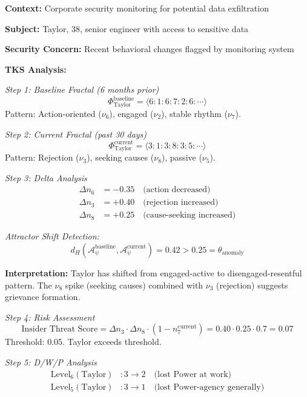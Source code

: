 \documentclass[11pt,twoside]{book}
\theoremstyle{definition}
\theoremstyle{plain}
\theoremstyle{remark}
\newcommand{\noe}[1]{\nu_{#1}}
\newcommand{\Frac}{\Phi}
\newcommand{\PsychAttractor}{\mathcal{A}_\psi}
\begin{document}
\begin{tcolorbox}[colback=yellow!5!white,colframe=yellow!65!black,title=\textbf{Scenario: Insider Threat Detection via Fractal Anomaly},breakable]

\textbf{Context:} Corporate security monitoring for potential data exfiltration

\textbf{Subject:} Taylor, 38, senior engineer with access to sensitive data

\textbf{Security Concern:} Recent behavioral changes flagged by monitoring system

\textbf{TKS Analysis:}

\textit{Step 1: Baseline Fractal (6 months prior)}
\[
    \Frac_{\mathrm{Taylor}}^{\mathrm{baseline}} = \langle 6:1:6:7:2:6:\cdots \rangle
\]
Pattern: Action-oriented ($\noe{6}$), engaged ($\noe{2}$), stable rhythm ($\noe{7}$).

\textit{Step 2: Current Fractal (past 30 days)}
\[
    \Frac_{\mathrm{Taylor}}^{\mathrm{current}} = \langle 3:1:3:8:3:5:\cdots \rangle
\]
Pattern: Rejection ($\noe{3}$), seeking causes ($\noe{8}$), passive ($\noe{5}$).

\textit{Step 3: Delta Analysis}
\begin{align*}
    \Delta n_6 &= -0.35 \quad \text{(action decreased)} \\
    \Delta n_3 &= +0.40 \quad \text{(rejection increased)} \\
    \Delta n_8 &= +0.25 \quad \text{(cause-seeking increased)}
\end{align*}

\textit{Attractor Shift Detection:}
\[
    d_H(\PsychAttractor^{\mathrm{baseline}}, \PsychAttractor^{\mathrm{current}}) = 0.42 > 0.25 = \theta_{\mathrm{anomaly}}
\]

\textbf{Interpretation:} Taylor has shifted from engaged-active to disengaged-resentful pattern. The $\noe{8}$ spike (seeking causes) combined with $\noe{3}$ (rejection) suggests grievance formation.

\textit{Step 4: Risk Assessment}
\[
    \text{Insider Threat Score} = \Delta n_3 \cdot \Delta n_8 \cdot (1 - n_7^{\mathrm{current}}) = 0.40 \cdot 0.25 \cdot 0.7 = 0.07
\]
Threshold: 0.05. Taylor exceeds threshold.

\textit{Step 5: D/W/P Analysis}
\begin{align*}
    \mathrm{Level}_6(\mathrm{Taylor}) &: 3 \to 2 \quad \text{(lost Power at work)} \\
    \mathrm{Level}_5(\mathrm{Taylor}) &: 3 \to 1 \quad \text{(lost Power-agency generally)}
\end{align*}


\end{tcolorbox}
\end{document}
